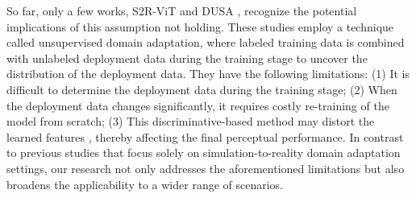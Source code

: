 
So far, only a few works, S2R-ViT \cite{li2023s2r} and DUSA \cite{akong2023dusa}, recognize the potential implications of this assumption not holding. These studies employ a technique called unsupervised domain adaptation, where labeled training data is combined with unlabeled deployment data during the training stage to uncover the distribution of the deployment data. They have the following limitations: (1) It is difficult to determine the deployment data during the training stage; (2) When the deployment data changes significantly, it requires costly re-training of the model from scratch; (3) This discriminative-based method may  distort the learned features \cite{tang2020unsupervised}, thereby affecting the final perceptual performance. In contrast to previous studies that focus solely on simulation-to-reality domain adaptation settings, our research not only addresses the aforementioned limitations but also broadens the applicability to a wider range of scenarios.


